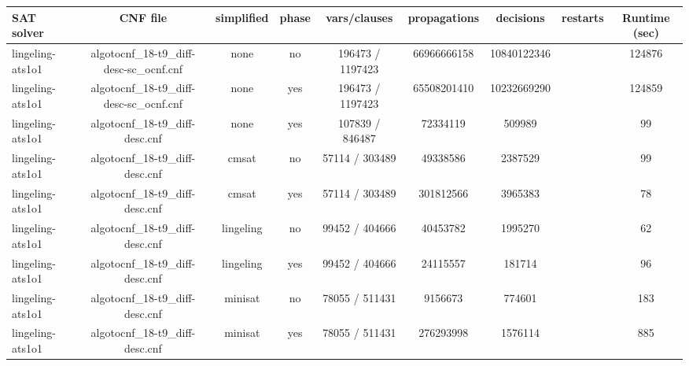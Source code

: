 \begin{appendices}
\begin{table}[p]
  \begin{center}
    \begin{tabular}{l|cccccccc}
        \textbf{SAT solver} & \textbf{CNF file} & \textbf{simplified} & \textbf{phase} & \textbf{vars/clauses} & \textbf{propagations} & \textbf{decisions} & \textbf{restarts} & \textbf{Runtime (sec)} \\
      \hline
  lingeling-ats1o1               & algotocnf\_18-t9\_diff-desc-sc\_ocnf.cnf & none       & no    & 196473 / 1197423 & 66966666158 & 10840122346 &            & 124876 \\ %
  lingeling-ats1o1               & algotocnf\_18-t9\_diff-desc-sc\_ocnf.cnf & none       & yes   & 196473 / 1197423 & 65508201410 & 10232669290 &            & 124859 \\ %
  lingeling-ats1o1               & algotocnf\_18-t9\_diff-desc.cnf & none       & yes   & 107839 / 846487 & 72334119  & 509989    &            & 99 \\ %
  lingeling-ats1o1               & algotocnf\_18-t9\_diff-desc.cnf & cmsat      & no    & 57114 / 303489 & 49338586  & 2387529   &            & 99 \\ %
  lingeling-ats1o1               & algotocnf\_18-t9\_diff-desc.cnf & cmsat      & yes   & 57114 / 303489 & 301812566 & 3965383   &            & 78 \\ %
  lingeling-ats1o1               & algotocnf\_18-t9\_diff-desc.cnf & lingeling  & no    & 99452 / 404666 & 40453782  & 1995270   &            & 62 \\ %
  lingeling-ats1o1               & algotocnf\_18-t9\_diff-desc.cnf & lingeling  & yes   & 99452 / 404666 & 24115557  & 181714    &            & 96 \\ %
  lingeling-ats1o1               & algotocnf\_18-t9\_diff-desc.cnf & minisat    & no    & 78055 / 511431 & 9156673   & 774601    &            & 183 \\ %
  lingeling-ats1o1               & algotocnf\_18-t9\_diff-desc.cnf & minisat    & yes   & 78055 / 511431 & 276293998 & 1576114   &            & 885 \\ %

\end{tabular}
\end{center}
\end{table}
\end{appendices}

